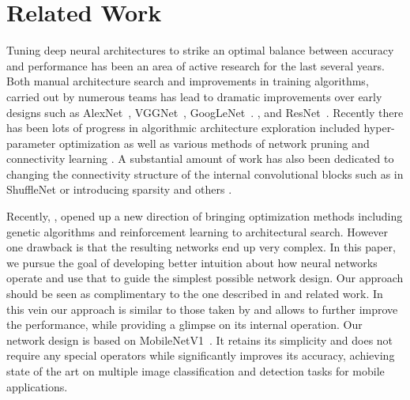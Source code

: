 \documentclass[10pt,twocolumn,letterpaper]{article}
\begin{document}
\section{Related Work}
Tuning deep neural architectures to strike an optimal balance between accuracy and performance has been an area of active research for the last several years.
Both manual architecture search and improvements in training algorithms, carried out by numerous teams has lead to dramatic improvements over early designs  such as \mbox{AlexNet}~\cite{AlexNet}, \mbox{VGGNet}~\cite{VGGNet}, \mbox{GoogLeNet}~\cite{GoogleNet}. , and \mbox{ResNet}~\cite{ResNet}.
Recently there has been lots of progress in algorithmic architecture exploration included hyper-parameter optimization \cite{BergstraRandomSearch, BayesianOptimizationML, BayesianOptimizationDNN} as well as various methods of network pruning \cite{BrainSurgeon,BrainDamage,Han2015,Han2016,Guo2016,LiPruning} and connectivity learning \cite{ConnectivityLearning,BudgetedSuperNetworks}.
A substantial amount of work has also been dedicated to changing the connectivity structure of the internal convolutional blocks such as in \mbox{ShuffleNet} \cite{ShuffleNet2017} or introducing sparsity \cite{PowerOfSparsity} and others \cite{SpatialBottleneck2016}. 

Recently, \cite{LearningToLearnScale,GeneticCNN,EvolutionImageClassifiers,NAS_reinforcement}, opened up a new direction of bringing optimization methods including genetic algorithms and reinforcement learning to architectural search.
However one drawback is that the resulting networks end up very complex.
In this paper, we pursue the goal of developing better intuition about how neural networks operate and use that to guide the simplest possible network design.
Our approach should be seen as complimentary to the one described in \cite{LearningToLearnScale} and related work.
In this vein our approach is similar to those taken by \cite{ShuffleNet2017, SpatialBottleneck2016} and allows to further improve the performance, while providing a glimpse on its internal operation.
Our network design is based on \mbox{MobileNetV1}~\cite{MobilenetV1}. It retains its simplicity and  does not require any special operators while significantly improves its accuracy, achieving state of the art on multiple image classification and detection tasks for mobile applications. 


\newcommand{\fig}[1]{Fig.~\ref{#1}}
\newcommand{\beveco}{Best viewed in color.}
\def\interior{\operatorname{interior}}
\end{document}
